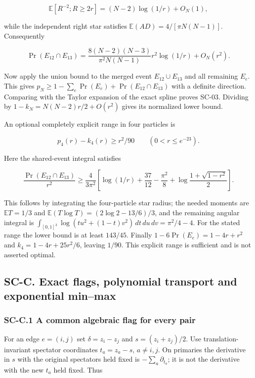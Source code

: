 \[
\mathbb E[R^{-2};R\geq2r]=(N-2)\log(1/r)+O_N(1),
\]

while the independent right star satisfies \(\mathbb E(AD)=4/[\pi N(N-1)]\). Consequently

\[
\Pr(E_{12}\cap E_{13})
=\frac{8(N-2)(N-3)}{\pi^2N(N-1)}
r^2\log(1/r)+O_N(r^2).
\]

Now apply the union bound to the merged event \(E_{12}\cup E_{13}\) and all remaining \(E_e\). This gives \(p_N\geq1-\sum_e\Pr(E_e)+\Pr(E_{12}\cap E_{13})\) with a definite direction. Comparing with the Taylor expansion of the exact spline proves SC-03. Dividing by \(1-k_N=N(N-2)r/2+O(r^2)\) gives its normalized lower bound.

An optional completely explicit range in four particles is

\[
p_4(r)-k_4(r)\geq r^2/90\qquad(0<r\leq e^{-23}).
\]

Here the shared-event integral satisfies

\[
\frac{\Pr(E_{12}\cap E_{13})}{r^2}
\geq\frac4{3\pi^2}
\left[\log(1/r)+\frac{37}{12}-\frac{\pi^2}{8}
+\log\frac{1+\sqrt{1-r^2}}2\right].
\]

This follows by integrating the four-particle star radius; the needed moments are \(\mathbb ET=1/3\) and \(\mathbb E(T\log T)=(2\log2-13/6)/3\), and the remaining angular integral is \(\int_{[0,1]^3}\log(tu^2+(1-t)v^2)\,dt\,du\,dv=\pi^2/4-4\). For the stated range the lower bound is at least \(143/45\). Finally \(1-6\Pr(E_e)=1-4r+r^2\) and \(k_4=1-4r+25r^2/6\), leaving \(1/90\). This explicit range is sufficient and is not asserted optimal.

\hypertarget{sc-c.-exact-flags-polynomial-transport-and-exponential-minmax}{%
\subsection{SC-C. Exact flags, polynomial transport and exponential min--max}\label{sc-c.-exact-flags-polynomial-transport-and-exponential-minmax}}

\hypertarget{sc-c.1-a-common-algebraic-flag-for-every-pair}{%
\subsubsection{SC-C.1 A common algebraic flag for every pair}\label{sc-c.1-a-common-algebraic-flag-for-every-pair}}

For an edge \(e=(i,j)\) set \(\delta=z_i-z_j\) and \(s=(z_i+z_j)/2\). Use translation-invariant spectator coordinates \(t_a=z_a-s\), \(a\ne i,j\). On primaries the derivative in \(s\) with the original spectators held fixed is \(-\sum_a\partial_{t_a}\); it is not the derivative with the new \(t_a\) held fixed. Thus

